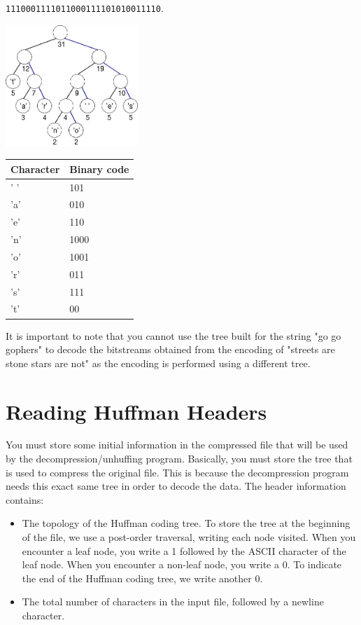 \documentclass[11pt]{article}
\begin{document}
\texttt{1110001111011000111101010011110}.

\begin{center}
  \includegraphics[width=5cm]{figures/streetstar}
\end{center}

\begin{tabular}{ll}
  \hline
  \textbf{Character} & \textbf{Binary code}\\
  \hline
  '  ' & 101\\
  'a' & 010\\
  'e' & 110\\
  'n' & 1000\\
  'o' & 1001\\
  'r' & 011\\
  's' & 111\\
  't' & 00\\
  \hline
\end{tabular}

It is important to note that you cannot use the tree built for the
string "go go gophers" to decode the bitstreams obtained from the
encoding of "streets are stone stars are not" as the encoding is
performed using a different tree.

\section{Reading Huffman Headers}
 
You must store some initial information in the compressed file that
will be used by the decompression/unhuffing program.  Basically, you
must store the tree that is used to compress the original file.  This
is because the decompression program needs this exact same tree in
order to decode the data.  The header information contains:

\begin{itemize}

\item The topology of the Huffman coding tree.  To store the tree at
  the beginning of the file, we use a post-order traversal, writing
  each node visited.  When you encounter a leaf node, you write a 1
  followed by the ASCII character of the leaf node.  When you
  encounter a non-leaf node, you write a 0.  To indicate the end of
  the Huffman coding tree, we write another 0.

\item The total number of characters in the input file, followed by a
  newline character.

\end{itemize}
 
\end{document}
